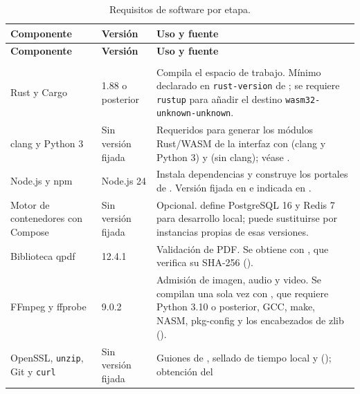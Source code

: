 \begin{longtable}{L{3.3cm} L{3.4cm} L{8.6cm}}
  \caption{Requisitos de software por etapa.}\label{tab:req-software} \\
  \toprule
  \textbf{Componente} & \textbf{Versión} & \textbf{Uso y fuente} \\
  \midrule
  \endfirsthead
  \toprule
  \textbf{Componente} & \textbf{Versión} & \textbf{Uso y fuente} \\
  \midrule
  \endhead
  \bottomrule
  \endfoot
     \\*
    \midrule
    Rust y Cargo
      & 1.88 o posterior
      & Compila el espacio de trabajo. Mínimo declarado en
        \texttt{rust-version} de ; se requiere
        \texttt{rustup} para añadir el destino
        \texttt{wasm32-unknown-unknown}. \\
    clang y Python 3
      & Sin versión fijada
      & Requeridos para generar los módulos Rust/WASM de la interfaz con
         (clang y Python 3) y
         (sin clang); véase
        . \\
    Node.js y npm
      & Node.js 24
      & Instala dependencias y construye los portales de .
        Versión fijada en  e indicada en
        . \\
    Motor de contenedores con Compose
      & Sin versión fijada
      & Opcional.  define PostgreSQL 16 y Redis 7
        para desarrollo local; puede sustituirse por instancias propias de
        esas versiones. \\
    Biblioteca qpdf
      & 12.4.1
      & Validación de PDF. Se obtiene con
        , que verifica su SHA-256
        (). \\
    FFmpeg y ffprobe
      & 9.0.2
      & Admisión de imagen, audio y video. Se compilan una sola vez con
        , que requiere Python
        3.10 o posterior, GCC, make, NASM, pkg-config y los encabezados de
        zlib (). \\
    OpenSSL, \texttt{unzip}, Git y \texttt{curl}
      & Sin versión fijada
      & Guiones de , sellado de tiempo local y
         (); obtención del

\end{longtable}
